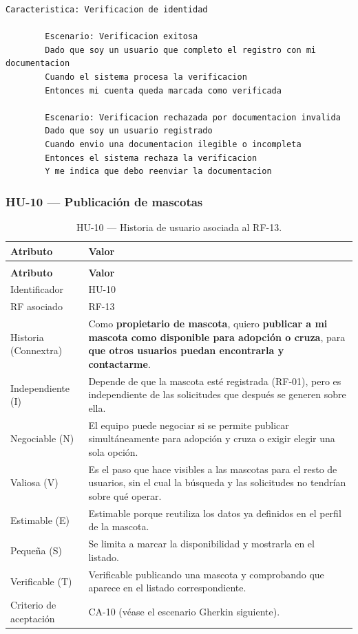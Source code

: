 \documentclass[journal,onecolumn]{IEEEtran}
\makeatletter
\newenvironment{atributos}[2]{%
	\small
	\begin{longtable}{@{}>{\raggedright\arraybackslash}p{4.2cm} >{\raggedright\arraybackslash}p{11.2cm}@{}}
		\caption{#2}\label{tab:#1}\\
		\toprule
		\textbf{Atributo} & \textbf{Valor} \\
		\midrule
		\endfirsthead
		\multicolumn{2}{@{}l}{\small\itshape (continuación)}\\
		\toprule
		\textbf{Atributo} & \textbf{Valor} \\
		\midrule
		\endhead
		\bottomrule
		\endlastfoot
	}{%
	\end{longtable}
	\normalsize
}
\makeatother
\begin{document}
	\begin{lstlisting}[style=gherkin,caption={CA-09 --- Escenario de aceptación de la historia HU-09.},label={lst:ca09}]
		Caracteristica: Verificacion de identidad
		
		Escenario: Verificacion exitosa
		Dado que soy un usuario que completo el registro con mi documentacion
		Cuando el sistema procesa la verificacion
		Entonces mi cuenta queda marcada como verificada
		
		Escenario: Verificacion rechazada por documentacion invalida
		Dado que soy un usuario registrado
		Cuando envio una documentacion ilegible o incompleta
		Entonces el sistema rechaza la verificacion
		Y me indica que debo reenviar la documentacion
	\end{lstlisting}
	
	\subsubsection{HU-10 --- Publicación de mascotas}
	
	\begin{atributos}{HU-10}{HU-10 --- Historia de usuario asociada al RF-13.}
		Identificador & HU-10 \\
		RF asociado & RF-13 \\
		Historia (Connextra) & Como \textbf{propietario de mascota}, quiero \textbf{publicar a mi mascota como disponible para adopción o cruza}, para \textbf{que otros usuarios puedan encontrarla y contactarme}. \\
		Independiente (I) & Depende de que la mascota esté registrada (RF-01), pero es independiente de las solicitudes que después se generen sobre ella. \\
		Negociable (N) & El equipo puede negociar si se permite publicar simultáneamente para adopción y cruza o exigir elegir una sola opción. \\
		Valiosa (V) & Es el paso que hace visibles a las mascotas para el resto de usuarios, sin el cual la búsqueda y las solicitudes no tendrían sobre qué operar. \\
		Estimable (E) & Estimable porque reutiliza los datos ya definidos en el perfil de la mascota. \\
		Pequeña (S) & Se limita a marcar la disponibilidad y mostrarla en el listado. \\
		Verificable (T) & Verificable publicando una mascota y comprobando que aparece en el listado correspondiente. \\
		Criterio de aceptación & CA-10 (véase el escenario Gherkin siguiente). \\
	\end{atributos}
	
\end{document}
